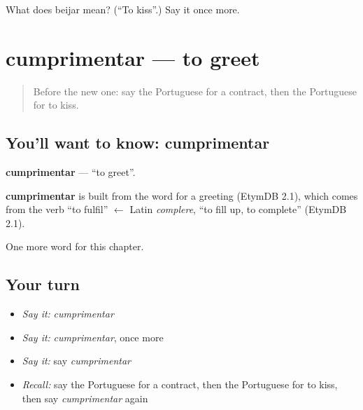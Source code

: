 \begin{tcolorbox}[breakable,colback=teal!4,colframe=teal!35!black,title={Before you move on}]
What does beijar mean? (\textquotedblleft{}To kiss\textquotedblright{}.) Say it once more.
\end{tcolorbox}
\section[cumprimentar]{cumprimentar — to greet}

\label{lesson:PT-C171-cumprimentar}



\begin{quote}
Before the new one: say the Portuguese for a contract, then the Portuguese for to kiss.
\end{quote}

\subsection*{You'll want to know: cumprimentar}
\textbf{cumprimentar} — \textquotedblleft{}to greet\textquotedblright{}.

\begin{cousinweb}
\textbf{cumprimentar} is built from the word for a greeting (EtymDB 2.1), which comes from the verb \textquotedblleft{}to fulfil\textquotedblright{} $\leftarrow$ Latin \emph{complere}, \textquotedblleft{}to fill up, to complete\textquotedblright{} (EtymDB 2.1).
\end{cousinweb}

\begin{grammarlens}[title={What you've built}]
One more word for this chapter.
\end{grammarlens}

\subsection*{Your turn}
\begin{itemize}
\raggedright
  \item \emph{Say it:} \emph{cumprimentar}
  \item \emph{Say it:} \emph{cumprimentar}, once more
  \item \emph{Say it:} say \emph{cumprimentar}
  \item \emph{Recall:} say the Portuguese for a contract, then the Portuguese for to kiss, then say \emph{cumprimentar} again
\end{itemize}

